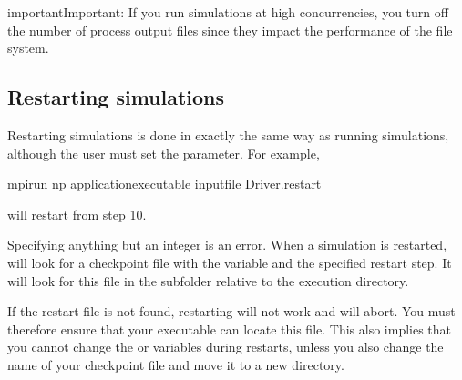 \documentclass[letterpaper,10pt,english]{sphinxmanual}
\begin{document}
\begin{sphinxVerbatim}[commandchars=\\\{\},formatcom=\scriptsize]
 
\end{sphinxVerbatim}

\begin{sphinxadmonition}{important}{Important:}
\sphinxAtStartPar
If you run simulations at high concurrencies, you  turn off the number of process output files since they impact the performance of the file system.
\end{sphinxadmonition}


\subsection{Restarting simulations}
\label{\detokenize{Base/Control:restarting-simulations}}\label{\detokenize{Base/Control:chap-restartingsimulations}}
\sphinxAtStartPar
Restarting simulations is done in exactly the same way as running simulations, although the user must set the  parameter.
For example,

\begin{sphinxVerbatim}[commandchars=\\\{\},formatcom=\scriptsize]
mpirun \PYGZhy{}np  \PYGZlt{}application\PYGZus{}executable\PYGZgt{} \PYGZlt{}input\PYGZus{}file\PYGZgt{} Driver.restart
\end{sphinxVerbatim}

\sphinxAtStartPar
will restart from step 10.

\sphinxAtStartPar
Specifying anything but an integer is an error.
When a simulation is restarted,  will look for a checkpoint file with the  variable and the specified restart step.
It will look for this file in the subfolder  relative to the execution directory.

\sphinxAtStartPar
If the restart file is not found, restarting will not work and  will abort.
You must therefore ensure that your executable can locate this file.
This also implies that you cannot change the  or  variables during restarts, unless you also change the name of your checkpoint file and move it to a new directory.
\end{document}

